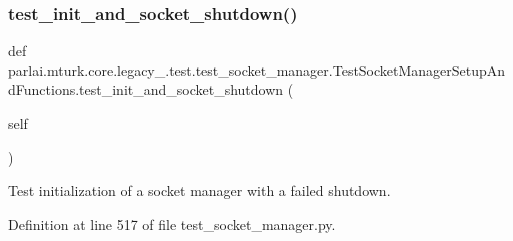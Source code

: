 \subsubsection{\texorpdfstring{test\+\_\+init\+\_\+and\+\_\+socket\+\_\+shutdown()}{test\_init\_and\_socket\_shutdown()}}
{\footnotesize\ttfamily def parlai.\+mturk.\+core.\+legacy\+\_.\+test.\+test\+\_\+socket\+\_\+manager.\+Test\+Socket\+Manager\+Setup\+And\+Functions.\+test\+\_\+init\+\_\+and\+\_\+socket\+\_\+shutdown (\begin{DoxyParamCaption}\item[{}]{self }\end{DoxyParamCaption})}

\begin{DoxyVerb}Test initialization of a socket manager with a failed shutdown.
\end{DoxyVerb}
 

Definition at line 517 of file test\+\_\+socket\+\_\+manager.\+py.


